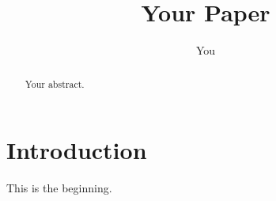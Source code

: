 \documentclass{article}
\title{Your Paper}
\author{You}
\begin{document}
\maketitle

\begin{abstract}
    Your abstract.
\end{abstract}

\section{Introduction}

This is the beginning.
\end{document}
